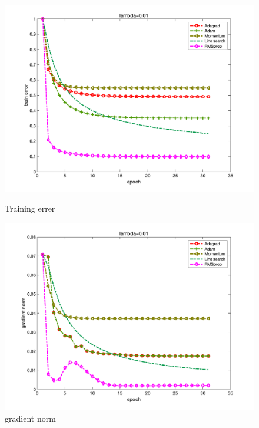 \documentclass{article}
\begin{document}
\begin{figure}[H]
\begin{minipage}{0.33\linewidth}
	\centering
	\includegraphics[width=1\linewidth]{./fig/fval_g4}
	\caption{Training errer}
\end{minipage}
\begin{minipage}{0.33\linewidth}
	\centering
	\includegraphics[width=1\linewidth]{./fig/gnorm_g4}
	\caption{gradient norm}
\end{minipage}
\begin{minipage}{0.33\linewidth}
	\centering

\end{minipage}
\end{figure}
\end{document}
